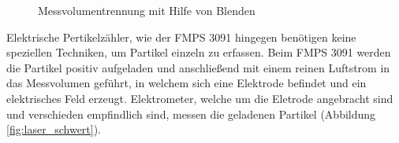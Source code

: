 \begin{figure}[H]
	\myfloatalign
	 \quad
	\caption[Messvolumentrennung mit Hilfe von Blenden\cite{reinraum}]
	{Messvolumentrennung mit Hilfe von Blenden\cite{reinraum}}
	\label{fig:optisch_trennung}
\end{figure}

Elektrische Pertikelz\"{a}hler, wie der FMPS 3091 hingegen ben\"{o}tigen keine speziellen Techniken, um Partikel einzeln zu erfassen. Beim FMPS 3091 werden die Partikel positiv aufgeladen und anschlie{\ss}end mit einem reinen Luftstrom in das Messvolumen gef\"{u}hrt, in welchem sich eine Elektrode befindet und ein elektrisches Feld erzeugt. Elektrometer, welche um die Eletrode angebracht sind und verschieden empfindlich sind, messen die geladenen Partikel (Abbildung \ref{fig:laser_schwert}).

